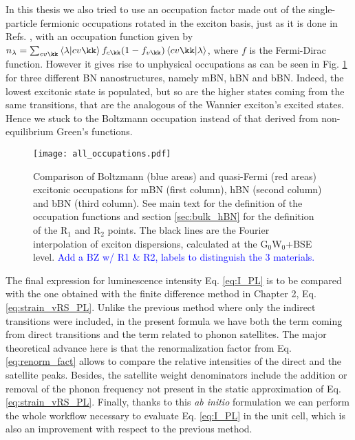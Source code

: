 In this thesis we also tried to use an occupation factor made out of the single-particle fermionic occupations rotated in the exciton basis, just as it is done in Refs. \cite{cannuccia2019theory,de2016unified,libbi2022phonon}, with an occupation function given by $n_{\lambda} = \sum_{cv\kk} \bra{\lambda}\ket{cv\kk} f_{c\kk} (1-f_{v\kk}) \bra{cv\kk}\ket{\lambda}$, where $f$ is the Fermi-Dirac function. However it gives rise to unphysical occupations as can be seen in Fig. \ref{fig:all_occup} for three different BN nanostructures, namely \acrshort{mBN}, \acrshort{hBN} and \acrshort{bBN}. Indeed, the lowest excitonic state is populated, but so are the higher states coming from the same transitions, that are the analogous of the Wannier exciton's excited states. Hence we stuck to the Boltzmann occupation instead of that derived from non-equilibrium Green's functions.
\begin{figure}[h!b]
	\vspace{0.2cm}
	\setcapindent{2em}
	\centering
	\texttt{[image: all\_occupations.pdf]}
	\caption{Comparison of Boltzmann (blue areas) and quasi-Fermi (red areas) excitonic occupations for \acrshort{mBN} (first column), \acrshort{hBN} (second column) and bBN (third column). See main text for the definition of the occupation functions and section \ref{sec:bulk_hBN} for the definition of the R$_1$ and R$_2$ points. The black lines are the Fourier interpolation of exciton dispersions, calculated at the G$_0$W$_0$+BSE level. \textcolor{blue}{Add a BZ w/ R1 \& R2, labels to distinguish the 3 materials.}}
	\label{fig:all_occup}
\end{figure}

The final expression for luminescence intensity Eq. \eqref{eq:I_PL} is to be compared with the one obtained with the finite difference method in Chapter 2, Eq. \eqref{eq:strain_vRS_PL}. Unlike the previous method where only the indirect transitions were included, in the present formula we have both the term coming from direct transitions and the term related to phonon satellites. The major theoretical advance here is that the renormalization factor from Eq. \eqref{eq:renorm_fact} allows to compare the relative intensities of the direct and the satellite peaks. Besides, the satellite weight denominators include the addition or removal of the phonon frequency not present in the static approximation of Eq. \eqref{eq:strain_vRS_PL}. Finally, thanks to this \textit{ab initio} formulation we can perform the whole workflow necessary to evaluate Eq. \eqref{eq:I_PL} in the unit cell, which is also an improvement with respect to the previous method. 


